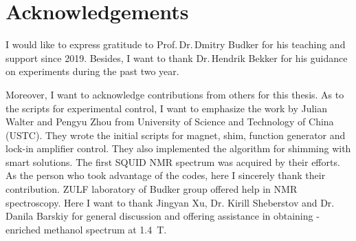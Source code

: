 \chapter{Acknowledgements}

I would like to express gratitude to Prof.\,Dr.\,Dmitry Budker for his teaching and support since 2019. Besides, I want to thank Dr.\,Hendrik Bekker for his guidance on experiments during the past two year. 

Moreover, I want to acknowledge contributions from others for this thesis. As to the scripts for experimental control, I want to emphasize the work by Julian Walter and Pengyu Zhou from University of Science and Technology of China (USTC). They wrote the initial scripts for magnet, shim, function generator and lock-in amplifier control. They also implemented the algorithm for shimming with smart solutions. The first SQUID NMR spectrum was acquired by their efforts. As the person who took advantage of the codes, here I sincerely thank their contribution. 
ZULF laboratory of Budker group offered help in NMR spectroscopy. Here I want to thank Jingyan Xu, Dr. Kirill Sheberstov and Dr. Danila Barskiy for general discussion and offering assistance in obtaining -enriched methanol spectrum at \SI{1.4}{\tesla}. 